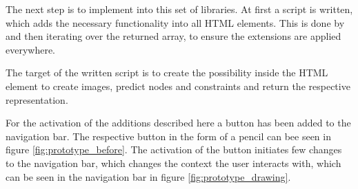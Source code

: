 The next step is to implement  into this set of libraries.
At first a script is written, which adds the necessary functionality into all  HTML elements.
This is done by  and then iterating over the returned array, to ensure the extensions are applied everywhere.

The target of the written script is to create the possibility inside the  HTML element to create images, predict nodes and constraints and return the respective  representation.

For the activation of the additions described here a button has been added to the navigation bar.
The respective button in the form of a pencil can bee seen in figure \ref{fig:prototype_before}.
The activation of the button initiates few changes to the navigation bar, which changes the context the user interacts with, which can be seen in the navigation bar in figure \ref{fig:prototype_drawing}.

